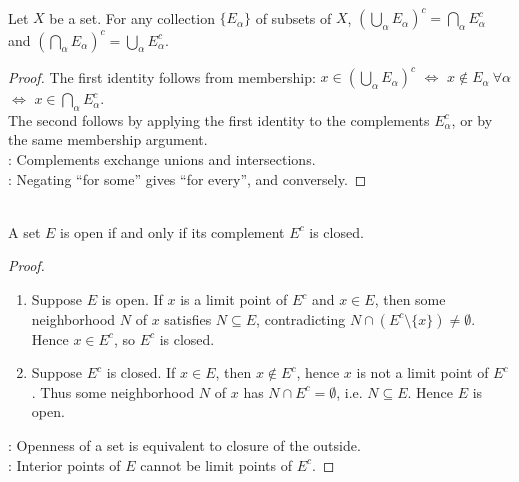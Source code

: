 \begin{theorem} \label{thm:metric-de-morgan-laws} \\
Let $X$ be a set. For any collection $\{E_\alpha\}$ of subsets of $X$, $\left(\bigcup\limits_\alpha E_\alpha\right)^c=\bigcap\limits_\alpha E_\alpha^c$ and $\left(\bigcap\limits_\alpha E_\alpha\right)^c=\bigcup\limits_\alpha E_\alpha^c$.
\begin{proof}
The first identity follows from membership: $x\in\left(\bigcup\limits_\alpha E_\alpha\right)^c$ $\Longleftrightarrow$ $x\notin E_\alpha \ \forall \alpha$ $\Longleftrightarrow$ $x\in\bigcap\limits_\alpha E_\alpha^c$.\\
The second follows by applying the first identity to the complements $E_\alpha^c$, or by the same membership argument.\\
: Complements exchange unions and intersections.\\
: Negating ``for some'' gives ``for every'', and conversely.
\end{proof}
\end{theorem}

\begin{theorem} \label{thm:open-iff-complement-closed} \\
A set $E$ is open if and only if its complement $E^c$ is closed.
\begin{proof}
\begin{enumerate}[label=\roman*.]
\setlength{\itemsep}{0pt}
\item[$(\Rightarrow)$] Suppose $E$ is open. If $x$ is a limit point of $E^c$ and $x\in E$, then some neighborhood $N$ of $x$ satisfies $N\subseteq E$, contradicting $N\cap(E^c\setminus\{x\})\neq\emptyset$. Hence $x\in E^c$, so $E^c$ is closed.
\item[$(\Leftarrow)$] Suppose $E^c$ is closed. If $x\in E$, then $x\notin E^c$, hence $x$ is not a limit point of $E^c$. Thus some neighborhood $N$ of $x$ has $N\cap E^c=\emptyset$, i.e. $N\subseteq E$. Hence $E$ is open.
\end{enumerate}
: Openness of a set is equivalent to closure of the outside.\\
: Interior points of $E$ cannot be limit points of $E^c$.
\end{proof}
\end{theorem}


